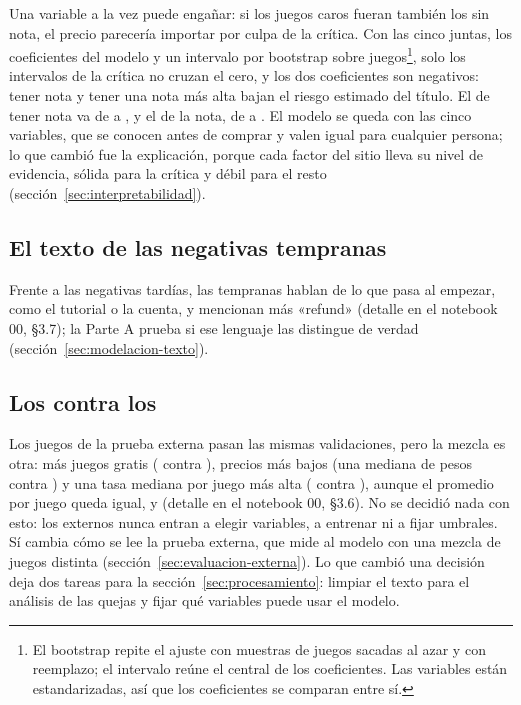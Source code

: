 Una variable a la vez puede engañar: si los juegos caros fueran también los sin nota, el precio
parecería importar por culpa de la crítica. Con las cinco juntas, los coeficientes del modelo y un
intervalo por bootstrap sobre juegos\footnote{El bootstrap repite el ajuste con muestras de juegos
sacadas al azar y con reemplazo; el intervalo reúne el \cifraNivelDeConfianza{} central de los
coeficientes. Las variables están estandarizadas, así que los coeficientes se comparan entre sí.},
solo los intervalos de la crítica no cruzan el cero, y los dos coeficientes son negativos: tener
nota y tener una nota más alta bajan el riesgo estimado del título. El de tener nota va de
\cifraCoefTieneNotaICInf{} a \cifraCoefTieneNotaICSup{}, y el de la nota, de \cifraCoefNotaICInf{}
a \cifraCoefNotaICSup{}. El modelo se queda con las cinco variables, que se conocen antes de comprar
y valen igual para cualquier persona; lo que cambió fue la explicación, porque cada factor del sitio
lleva su nivel de evidencia, sólida para la crítica y débil para el resto
(sección~\ref{sec:interpretabilidad}).

\subsection{El texto de las negativas tempranas}\label{sec:exploracion-texto}

Frente a las negativas tardías, las tempranas hablan de lo que pasa al empezar, como el tutorial o
la cuenta, y mencionan más «refund» (detalle en el notebook 00, §3.7); la Parte A prueba si ese
lenguaje las distingue de verdad (sección~\ref{sec:modelacion-texto}).

\subsection{Los \cifraJuegosEntrenamiento{} contra los \cifraJuegosExternos{}}\label{sec:exploracion-externos}

Los \cifraJuegosExternos{} juegos de la prueba externa pasan las mismas validaciones, pero la mezcla
es otra: más juegos gratis (\cifraGratisExternos{} contra \cifraGratisEntrenamiento{}), precios más
bajos (una mediana de \cifraPrecioMedianoExternos{} pesos contra \cifraPrecioMedianoEntrenamiento{})
y una tasa mediana por juego más alta (\cifraTasaExternosMedianaJuegos{} contra
\cifraTasaEntrenamientoMedianaJuegos{}), aunque el promedio por juego queda igual,
\cifraTasaEntrenamientoPromJuegos{} y \cifraTasaExternosPromJuegos{}
(detalle en el notebook 00, §3.6). No se decidió nada con esto: los externos nunca entran a elegir
variables, a entrenar ni a fijar umbrales. Sí cambia cómo se lee la prueba externa, que mide al
modelo con una mezcla de juegos distinta (sección~\ref{sec:evaluacion-externa}). Lo que cambió una
decisión deja dos tareas para la sección~\ref{sec:procesamiento}: limpiar el texto para el
análisis de las quejas y fijar qué variables puede usar el modelo.
